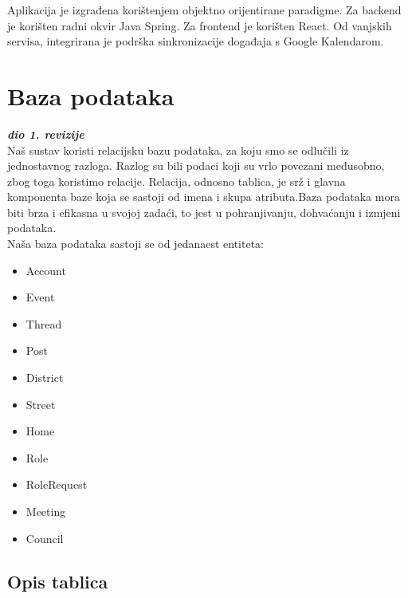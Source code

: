 		Aplikacija je izgrađena korištenjem objektno orijentirane paradigme. Za backend je korišten radni okvir Java Spring. Za frontend je korišten React. Od vanjskih servisa, integrirana je podrška sinkronizacije događaja s Google Kalendarom.
	
		

		

				
		\section{Baza podataka}
			
			\textbf{\textit{dio 1. revizije}}\\
			
		
Naš sustav koristi relacijsku bazu podataka, za koju smo se odlučili iz jednostavnog razloga. Razlog su bili podaci koji su vrlo povezani međusobno, zbog toga koristimo relacije. Relacija, odnosno tablica, je srž i glavna komponenta baze koja se sastoji od imena i skupa atributa.Baza podataka mora biti brza i efikasna u svojoj zadaći, to jest u pohranjivanju, dohvaćanju i izmjeni podataka.\\
Naša baza podataka sastoji se od jedanaest entiteta:
\begin{multicols}{3}

\begin{itemize}
\item Account
\item Event
\item Thread
\item Post

\end{itemize}

\columnbreak

\begin{itemize}
\item District
\item Street
\item Home
\item Role

\end{itemize}

\begin{itemize}
\item RoleRequest
\item Meeting
\item Council
\end{itemize}
\end{multicols}
		
			\subsection{Opis tablica}
			
